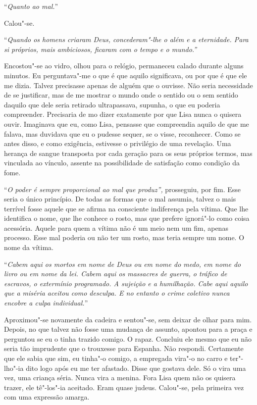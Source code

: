 ``\emph{Quanto ao mal.}''

Calou"-se.

``\emph{Quando os homens criaram Deus, concederam"-lhe o além e a
eternidade. Para si próprios, mais ambiciosos, ficaram com o tempo e o
mundo.''}

Encostou"-se ao vidro, olhou para o relógio, permaneceu calado durante
alguns minutos. Eu perguntava"-me o que é que aquilo significava, ou
por que é que ele me dizia. Talvez precisasse apenas de alguém que o
ouvisse. Não seria necessidade de se justificar, mas de me mostrar o
mundo onde o sentido ou o sem sentido daquilo que dele seria retirado
ultrapassava, supunha, o que eu poderia compreender. Precisaria de mo
dizer exatamente por que Lisa nunca o quisera ouvir. Imaginava que eu,
como Lisa, pensasse que compreendia aquilo de que me falava, mas
duvidava que eu o pudesse sequer, se o visse, reconhecer. Como se antes
disso, e como exigência, estivesse o privilégio de uma revelação. Uma
herança de sangue transposta por cada geração para os seus próprios
termos, mas vinculada ao vínculo, assente na possibilidade de satisfação
como condição da fome.

``\emph{O poder é sempre proporcional ao mal que produz'',}
prosseguiu, por fim. Esse seria o único princípio. De todas as formas
que o mal assumia, talvez o mais terrível fosse aquele que se afirma na
consciente indiferença pela vítima. Que lhe identifica o nome, que lhe
conhece o rosto, mas que prefere ignorá"-lo como coisa acessória. Aquele
para quem a vítima não é um meio nem um fim, apenas processo. Esse mal
poderia ou não ter um rosto, mas teria sempre um nome. O nome da vítima.

``\emph{Cabem aqui os mortos em nome de Deus ou em nome do medo, em nome
do livro ou em nome da lei. Cabem aqui os massacres de guerra, o tráfico
de escravos, o extermínio programado. A sujeição e a humilhação. Cabe
aqui aquilo que a miséria aceitou como desculpa. E no entanto o crime
coletivo nunca encobre a culpa individual.}''

Aproximou"-se novamente da cadeira e sentou"-se, sem deixar de olhar
para mim. Depois, no que talvez não fosse uma mudança de assunto,
apontou para a praça e perguntou se eu o tinha trazido comigo. O rapaz.
Concluiu ele mesmo que eu não seria tão imprudente que o trouxesse para
Espanha. Não respondi. Certamente que ele sabia que sim, eu tinha"-o
comigo, a empregada vira"-o no carro e ter"-lho"-ia dito logo após eu me
ter afastado. Disse que gostava dele. Só o vira uma vez, uma criança
séria. Nunca vira a menina. Fora Lisa quem não os quisera trazer, ele
tê"-los"-ia aceitado. Eram quase judeus. Calou"-se, pela primeira vez
com uma expressão amarga.

